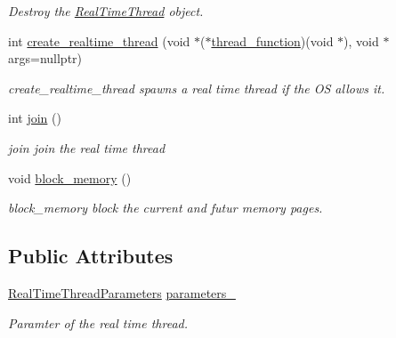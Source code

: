 \begin{DoxyCompactItemize}
\begin{DoxyCompactList}\small\item\em Destroy the \hyperlink{classreal__time__tools_1_1RealTimeThread}{Real\+Time\+Thread} object. \end{DoxyCompactList}\item 
int \hyperlink{classreal__time__tools_1_1RealTimeThread_a232e3955fee6e80c3a7ded68f165414b}{create\+\_\+realtime\+\_\+thread} (void $\ast$($\ast$\hyperlink{realtime__test_8cpp_a54b1343eb90254009bd964c44996761b}{thread\+\_\+function})(void $\ast$), void $\ast$args=nullptr)
\begin{DoxyCompactList}\small\item\em create\+\_\+realtime\+\_\+thread spawns a real time thread if the OS allows it. \end{DoxyCompactList}\item 
int \hyperlink{classreal__time__tools_1_1RealTimeThread_a2f455db9fd80b81e5e69cd22e8529979}{join} ()
\begin{DoxyCompactList}\small\item\em join join the real time thread \end{DoxyCompactList}\item 
void \hyperlink{classreal__time__tools_1_1RealTimeThread_a704b245872cc7bc49e01181f09732535}{block\+\_\+memory} ()
\begin{DoxyCompactList}\small\item\em block\+\_\+memory block the current and futur memory pages. \end{DoxyCompactList}\end{DoxyCompactItemize}
\subsection*{Public Attributes}
\begin{DoxyCompactItemize}
\item 
\hyperlink{classreal__time__tools_1_1RealTimeThreadParameters}{Real\+Time\+Thread\+Parameters} \hyperlink{classreal__time__tools_1_1RealTimeThread_aa15b5633e76ea6b4c31cd74b3968686a}{parameters\+\_\+}\hypertarget{classreal__time__tools_1_1RealTimeThread_aa15b5633e76ea6b4c31cd74b3968686a}{}\label{classreal__time__tools_1_1RealTimeThread_aa15b5633e76ea6b4c31cd74b3968686a}

\begin{DoxyCompactList}\small\item\em Paramter of the real time thread. \end{DoxyCompactList}\end{DoxyCompactItemize}


